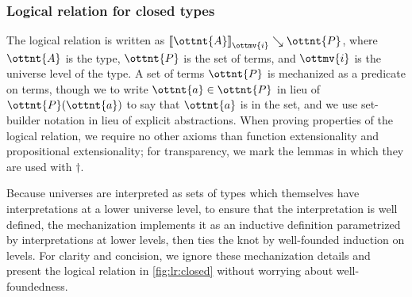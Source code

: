 \documentclass[a4paper,UKenglish,cleveref,autoref,thm-restate]{lipics-v2021}
\begin{document}
\subsubsection{Logical relation for closed types}

The logical relation is written as $ \mathopen{\llbracket}  \ottnt{A}  \mathclose{\rrbracket}_{ \ottmv{i} } \searrow  \ottnt{P} $,
where $\ottnt{A}$ is the type, $\ottnt{P}$ is the set of terms,
and $\ottmv{i}$ is the universe level of the type.
A set of terms $\ottnt{P}$ is mechanized as a predicate on terms,
though we to write $ \ottnt{a}  \in  \ottnt{P} $ in lieu of $\ottnt{P}(\ottnt{a})$
to say that $\ottnt{a}$ is in the set,
and we use set-builder notation in lieu of explicit abstractions.
When proving properties of the logical relation,
we require no other axioms than function extensionality and propositional extensionality;
for transparency, we mark the lemmas in which they are used with $\dagger$.

Because universes are interpreted as sets of types
which themselves have interpretations at a lower universe level,
to ensure that the interpretation is well defined,
the mechanization implements it as an inductive definition
parametrized by interpretations at lower levels,
then ties the knot by well-founded induction on levels.
For clarity and concision, we ignore these mechanization details
and present the logical relation in \cref{fig:lr:closed}
without worrying about well-foundedness.
\end{document}
